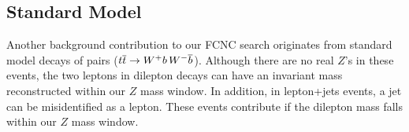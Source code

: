 

\subsection[Standard Model \ttbar]{Standard Model \boldmath\ttbar\unboldmath}
Another background contribution to our FCNC search
originates from standard model decays of \ttbar pairs (${t\overline{t}}
\to W^{+} b\, W^{-} \overline{b}$). Although there are no real $Z$'s in these
events, the two leptons in dilepton decays can have an invariant mass
reconstructed within our $Z$ mass window. In addition, in lepton+jets
events, a jet can be misidentified as a lepton. These events
contribute if the dilepton mass falls within our $Z$ mass window.

